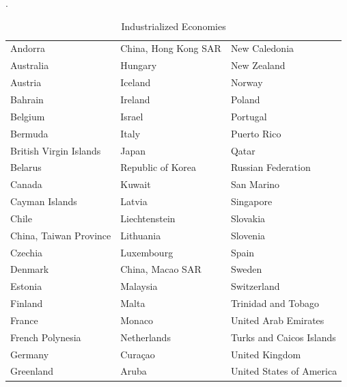 \documentclass[
  openany, nofonts]{tufte-book}
\begin{document}
.

\pagebreak

\begin{table}[!h]

\caption{\label{tab:c99-INDtab}Industrialized Economies}
\centering
\fontsize{10}{12}\selectfont
\begin{tabular}[t]{lll}
\toprule
Andorra & China, Hong Kong SAR & New Caledonia\\
Australia & Hungary & New Zealand\\
Austria & Iceland & Norway\\
Bahrain & Ireland & Poland\\
Belgium & Israel & Portugal\\
Bermuda & Italy & Puerto Rico\\
British Virgin Islands & Japan & Qatar\\
Belarus & Republic of Korea & Russian Federation\\
Canada & Kuwait & San Marino\\
Cayman Islands & Latvia & Singapore\\
Chile & Liechtenstein & Slovakia\\
China, Taiwan Province & Lithuania & Slovenia\\
Czechia & Luxembourg & Spain\\
Denmark & China, Macao SAR & Sweden\\
Estonia & Malaysia & Switzerland\\
Finland & Malta & Trinidad and Tobago\\
France & Monaco & United Arab Emirates\\
French Polynesia & Netherlands & Turks and Caicos Islands\\
Germany & Curaçao & United Kingdom\\
Greenland & Aruba & United States of America\\
\bottomrule
\end{tabular}
\end{table}
\end{document}
